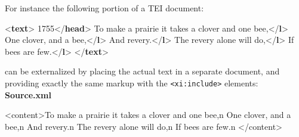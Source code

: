 For instance the following portion of a TEI document: \par\bgroup{}\exampleFont \begin{shaded}\noindent\mbox{}{<\textbf{text}>}\mbox{}\newline 
{}\mbox{}\newline 
\hspace*{1em}1755{</\textbf{head}>}\mbox{}\newline 
\hspace*{1em}To make a prairie it takes a clover and one bee,{</\textbf{l}>}\mbox{}\newline 
\hspace*{1em}One clover, and a bee,{</\textbf{l}>}\mbox{}\newline 
\hspace*{1em}And revery.{</\textbf{l}>}\mbox{}\newline 
\hspace*{1em}The revery alone will do,{</\textbf{l}>}\mbox{}\newline 
\hspace*{1em}If bees are few.{</\textbf{l}>}\mbox{}\newline 
{}\mbox{}\newline 
{</\textbf{text}>}\end{shaded}\egroup\par \noindent  can be externalized by placing the actual text in a separate document, and providing exactly the same markup with the \texttt{<xi:include>} elements: \mbox{}\newline 
  \textbf{Source.xml} \par\hfill\bgroup\exampleFont\vskip 10pt\begin{shaded}
\obeyspaces <content>To make a prairie it takes a clover and one bee,⃥n\newline
One clover, and a bee,⃥n\newline
And revery.⃥n\newline
The revery alone will do,⃥n\newline
If bees are few.⃥n\newline
</content>\end{shaded}
